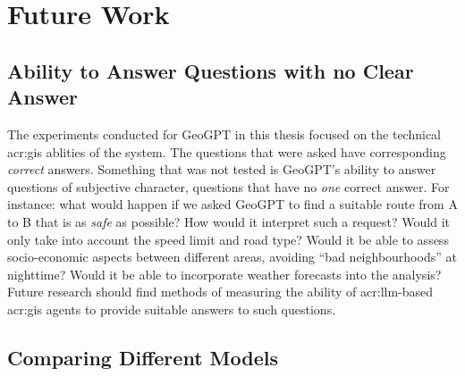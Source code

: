 \section{Future Work}
\label{sec:future-work}

\begin{comment}
Consider where you would like to extend or improve this work, or how somebody else could continue it.
These extensions might either be continuing the ongoing direction or taking a side direction that became obvious during the work.
Further, possible solutions to limitations in the work conducted, highlighted in Section~\ref{sec:discussion} may be presented.

Note that in the Specialisation Project Report, the Future Work section will be a key part of your plan for the novel work to be carried out in the next semester,
while in the Master's Thesis, the Future Work section rather will point to issues that others might be interested in addressing.
This can include options and alternatives that you did not try out yourself, or potential improvements and extensions to your experiments or system.
\end{comment}

\subsection{Ability to Answer Questions with no Clear Answer}

The experiments conducted for GeoGPT in this thesis focused on the technical \acrshort{acr:gis} ablities of the system. The questions that were asked have corresponding \textit{correct} answers. Something that was not tested is GeoGPT's ability to answer questions of subjective character, questions that have no \textit{one} correct answer. For instance: what would happen if we asked GeoGPT to find a suitable route from A to B that is as \textit{safe} as possible? How would it interpret such a request? Would it only take into account the speed limit and road type? Would it be able to assess socio-economic aspects between different areas, avoiding \enquote{bad neighbourhoods} at nighttime? Would it be able to incorporate weather forecasts into the analysis? Future research should find methods of measuring the ability of \acrshort{acr:llm}-based \acrshort{acr:gis} agents to provide suitable answers to such questions.

\subsection{Comparing Different Models}

